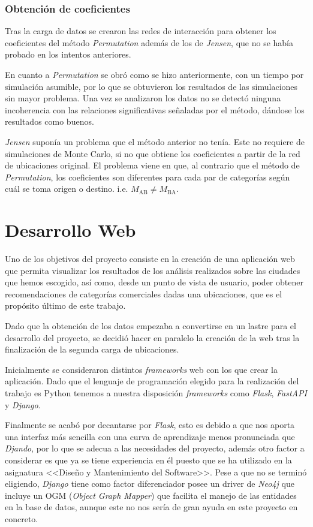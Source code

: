 \subsubsection{Obtención de coeficientes}

Tras la carga de datos se crearon las redes de interacción para obtener los coeficientes del método \textit{Permutation} además de los de \textit{Jensen}, que no se había probado en los intentos anteriores.

En cuanto a \textit{Permutation} se obró como se hizo anteriormente, con un tiempo por simulación asumible, por lo que se obtuvieron los resultados de las simulaciones sin mayor problema. Una vez se analizaron los datos no se detectó ninguna incoherencia con las relaciones significativas señaladas por el método, dándose los resultados como buenos.

\textit{Jensen} suponía un problema que el método anterior no tenía. Este no requiere de simulaciones de Monte Carlo, si no que obtiene los coeficientes a partir de la red de ubicaciones original. El problema viene en que, al contrario que el método de \textit{Permutation}, los coeficientes son diferentes para cada par de categorías según cuál se toma origen o destino. i.e. $M_\text{AB} \neq M_\text{BA}$.



\section{Desarrollo Web}
Uno de los objetivos del proyecto consiste en la creación de una aplicación web que permita visualizar los resultados de los análisis realizados sobre las ciudades que hemos escogido, así como, desde un punto de vista de usuario, poder obtener recomendaciones de categorías comerciales dadas una ubicaciones, que es el propósito último de este trabajo.

Dado que la obtención de los datos empezaba a convertirse en un lastre para el desarrollo del proyecto, se decidió hacer en paralelo la creación de la web tras la finalización de la segunda carga de ubicaciones.

Inicialmente se consideraron distintos \textit{frameworks} web con los que crear la aplicación. Dado que el lenguaje de programación elegido para la realización del trabajo es Python tenemos a nuestra disposición \textit{frameworks} como \textit{Flask}, \textit{FastAPI} y \textit{Django}.

Finalmente se acabó por decantarse por \textit{Flask}, esto es debido a que nos aporta una interfaz más sencilla con una curva de aprendizaje menos pronunciada que \textit{Djando}, por lo que se adecua a las necesidades del proyecto, además otro factor a considerar es que ya se tiene experiencia en él puesto que se ha utilizado en la asignatura <<Diseño y Mantenimiento del Software>>. Pese a que no se terminó eligiendo, \textit{Django} tiene como factor diferenciador posee un driver de \textit{Neo4j} que incluye un OGM (\textit{Object Graph Mapper}) que facilita el manejo de las entidades en la base de datos, aunque este no nos sería de gran ayuda en este proyecto en concreto.

